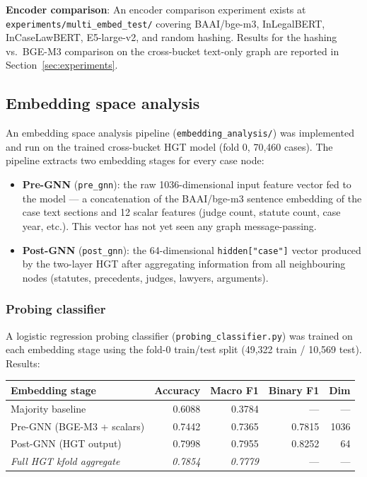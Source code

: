 \documentclass[12pt,a4paper]{article}
\begin{document}
\textbf{Encoder comparison}: An encoder comparison experiment exists at \texttt{experiments/multi\_embed\_test/} covering BAAI/bge-m3, InLegalBERT, InCaseLawBERT, E5-large-v2, and random hashing. Results for the hashing vs.\ BGE-M3 comparison on the cross-bucket text-only graph are reported in Section~\ref{sec:experiments}.

\subsection{Embedding space analysis}

An embedding space analysis pipeline (\texttt{embedding\_analysis/}) was implemented and run on the trained cross-bucket HGT model (fold 0, 70{,}460 cases). The pipeline extracts two embedding stages for every case node:

\begin{itemize}[noitemsep]
  \item \textbf{Pre-GNN} (\texttt{pre\_gnn}): the raw 1036-dimensional input feature vector fed to the model — a concatenation of the BAAI/bge-m3 sentence embedding of the case text sections and 12 scalar features (judge count, statute count, case year, etc.). This vector has not yet seen any graph message-passing.
  \item \textbf{Post-GNN} (\texttt{post\_gnn}): the 64-dimensional \texttt{hidden["case"]} vector produced by the two-layer HGT after aggregating information from all neighbouring nodes (statutes, precedents, judges, lawyers, arguments).
\end{itemize}

\subsubsection{Probing classifier}

A logistic regression probing classifier (\texttt{probing\_classifier.py}) was trained on each embedding stage using the fold-0 train/test split (49{,}322 train / 10{,}569 test). Results:

\begin{center}
\begin{tabular}{lrrrr}
\toprule
\textbf{Embedding stage} & \textbf{Accuracy} & \textbf{Macro F1} & \textbf{Binary F1} & \textbf{Dim} \\
\midrule
Majority baseline & 0.6088 & 0.3784 & --- & --- \\
Pre-GNN (BGE-M3 + scalars) & 0.7442 & 0.7365 & 0.7815 & 1036 \\
Post-GNN (HGT output) & 0.7998 & 0.7955 & 0.8252 & 64 \\
\midrule
\textit{Full HGT kfold aggregate} & \textit{0.7854} & \textit{0.7779} & --- & --- \\
\bottomrule
\end{tabular}
\end{center}
\end{document}
